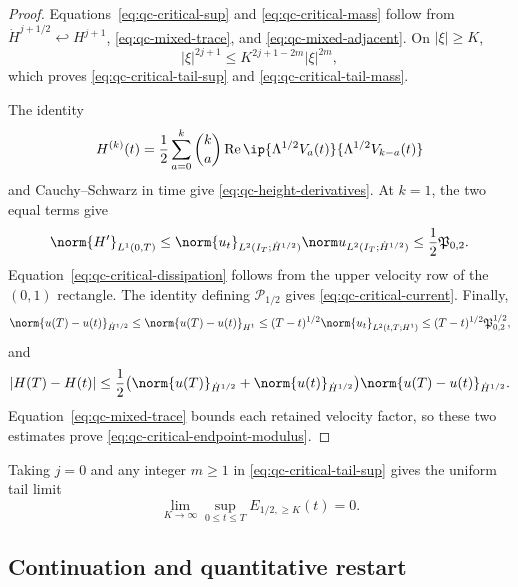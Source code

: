 \begin{proof}
Equations~\eqref{eq:qc-critical-sup} and
\eqref{eq:qc-critical-mass} follow from
\(\dot H^{j+1/2}\hookleftarrow H^{j+1}\),
\eqref{eq:qc-mixed-trace}, and \eqref{eq:qc-mixed-adjacent}.
On \(|\xi|\ge K\),
\[
 |\xi|^{2j+1}\le K^{2j+1-2m}|\xi|^{2m},
\]
which proves \eqref{eq:qc-critical-tail-sup} and
\eqref{eq:qc-critical-tail-mass}.

The identity
\[
 H^{(k)}(t)
 =\frac12\sum_{a=0}^{k}\binom ka
 \operatorname{Re}\ip{\Lambda^{1/2}V_a(t)}
 {\Lambda^{1/2}V_{k-a}(t)}
\]
and Cauchy--Schwarz in time give
\eqref{eq:qc-height-derivatives}.  At \(k=1\), the two equal terms give
\[
 \norm{H'}_{L^1(0,T)}
 \le\norm{u_t}_{L^2(I_T;\dot H^{1/2})}
     \norm u_{L^2(I_T;\dot H^{1/2})}
 \le\frac12\mathfrak P_{0,2}.
\]
Equation~\eqref{eq:qc-critical-dissipation} follows from the upper velocity
row of the \((0,1)\) rectangle.  The identity defining
\(\mathcal P_{1/2}\) gives \eqref{eq:qc-critical-current}.  Finally,
\[
 \norm{u(T)-u(t)}_{\dot H^{1/2}}
 \le\norm{u(T)-u(t)}_{H^1}
 \le(T-t)^{1/2}\norm{u_t}_{L^2(t,T;H^1)}
 \le(T-t)^{1/2}\mathfrak P_{0,2}^{1/2},
\]
and
\[
 |H(T)-H(t)|
 \le\frac12\bigl(
 \norm{u(T)}_{\dot H^{1/2}}+\norm{u(t)}_{\dot H^{1/2}}
 \bigr)\norm{u(T)-u(t)}_{\dot H^{1/2}}.
\]
Equation~\eqref{eq:qc-mixed-trace} bounds each retained velocity factor, so
these two estimates prove \eqref{eq:qc-critical-endpoint-modulus}.
\end{proof}

Taking \(j=0\) and any integer \(m\ge1\) in
\eqref{eq:qc-critical-tail-sup} gives the uniform tail limit
\begin{equation}
 \lim_{K\to\infty}\sup_{0\le t\le T}
 E_{1/2,\ge K}(t)=0.
 \label{eq:qc-critical-tail-extinction}
\end{equation}

\subsection{Continuation and quantitative restart}

